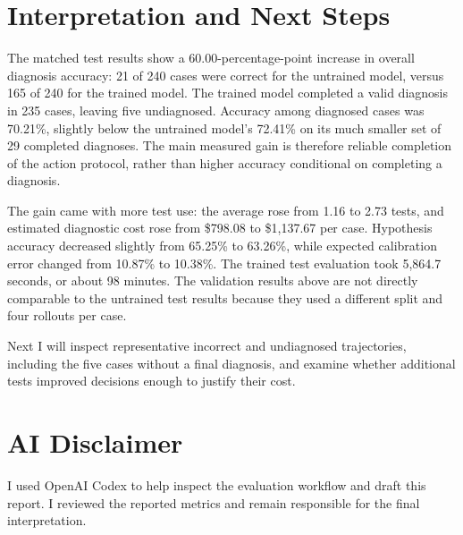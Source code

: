 \documentclass[11pt]{article}
\begin{document}
\section{Interpretation and Next Steps}

The matched test results show a 60.00-percentage-point increase in overall
diagnosis accuracy: 21 of 240 cases were correct for the untrained model,
versus 165 of 240 for the trained model. The trained model completed a valid
diagnosis in 235 cases, leaving five undiagnosed. Accuracy among diagnosed
cases was 70.21\%, slightly below the untrained model's 72.41\% on its much
smaller set of 29 completed diagnoses. The main measured gain is therefore
reliable completion of the action protocol, rather than higher accuracy
conditional on completing a diagnosis.

The gain came with more test use: the average rose from 1.16 to 2.73 tests,
and estimated diagnostic cost rose from \$798.08 to \$1,137.67 per case.
Hypothesis accuracy decreased slightly from 65.25\% to 63.26\%, while expected
calibration error changed from 10.87\% to 10.38\%. The trained test evaluation
took 5,864.7 seconds, or about 98 minutes. The validation results above are
not directly comparable to the untrained test results because they used a
different split and four rollouts per case.

Next I will inspect representative incorrect and undiagnosed trajectories,
including the five cases without a final diagnosis, and examine whether
additional tests improved decisions enough to justify their cost.

\section{AI Disclaimer}

I used OpenAI Codex to help inspect the evaluation workflow and draft this
report. I reviewed the reported metrics and remain responsible for the final
interpretation.
\end{document}
